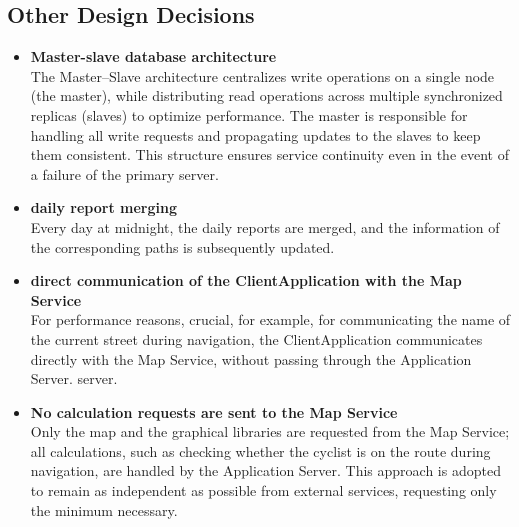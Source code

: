 \subsection{Other Design Decisions}
\begin{itemize}
    \item \textbf{Master-slave database architecture}\\
    The Master–Slave architecture centralizes write operations on a single node (the master), while distributing read operations across multiple synchronized replicas (slaves) to optimize performance. The master is responsible for handling all write requests and propagating updates to the slaves to keep them consistent. This structure ensures service continuity even in the event of a failure of the primary server.
    \item \textbf{daily report merging}\\
    Every day at midnight, the daily reports are merged, and the information of the corresponding paths is subsequently updated.\\
    \item \textbf{direct communication of the ClientApplication with the Map Service}\\
    For performance reasons, crucial, for example, for communicating the name of the current street during navigation, the ClientApplication communicates directly with the Map Service, without passing through the Application Server. server.
    \item \textbf{No calculation requests are sent to the Map Service}\\
    Only the map and the graphical libraries are requested from the Map Service; all calculations, such as checking whether the cyclist is on the route during navigation, are handled by the Application Server. This approach is adopted to remain as independent as possible from external services, requesting only the minimum necessary.
\end{itemize}

\newpage